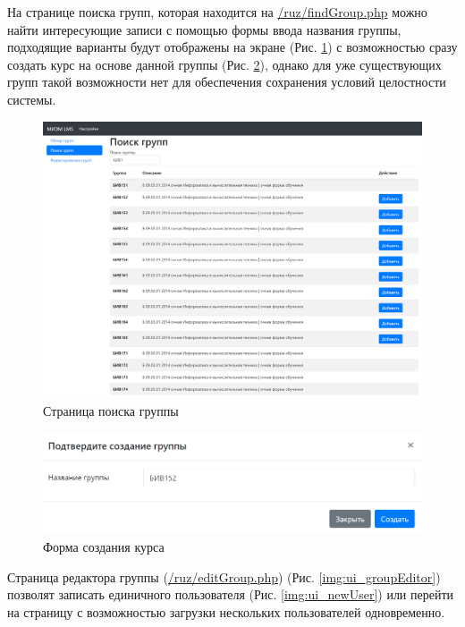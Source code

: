 \documentclass[a4paper,14pt]{article}
\begin{document}
На странице поиска групп, которая находится на \url{/ruz/findGroup.php} можно найти интересующие записи с помощью формы ввода названия группы, подходящие варианты будут отображены на экране (Рис. \ref{img:ui_search}) с возможностью сразу создать курс на основе данной группы (Рис. \ref{img:ui_newGroup}), однако для уже существующих групп такой возможности нет для обеспечения сохранения условий целостности системы.

\begin{figure}[H]
	\centering
	\includegraphics[width=\linewidth]{image/ui_search}
	\caption{Страница поиска группы}
	\label{img:ui_search}
\end{figure}
\begin{figure}[H]
	\centering
	\includegraphics[width=\linewidth]{image/ui_newGroup}
	\caption{Форма создания курса}
	\label{img:ui_newGroup}
\end{figure}

Страница редактора группы (\url{/ruz/editGroup.php}) (Рис. \ref{img:ui_groupEditor}) позволят записать единичного пользователя (Рис. \ref{img:ui_newUser}) или перейти на страницу с возможностью загрузки нескольких пользователей одновременно.
\end{document}
